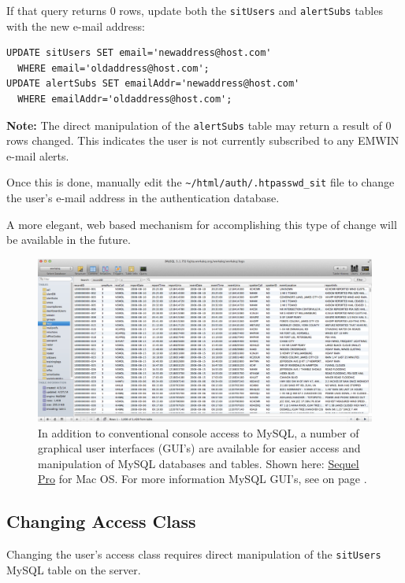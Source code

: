 \documentclass[pdflatex,letterpaper,twoside,12pt]{book}
\begin{document}
If that query returns 0 rows, update both the \verb|sitUsers| and \verb|alertSubs| tables with the new e-mail address:

\begin{verbatim}
UPDATE sitUsers SET email='newaddress@host.com'
  WHERE email='oldaddress@host.com';
UPDATE alertSubs SET emailAddr='newaddress@host.com'
  WHERE emailAddr='oldaddress@host.com';
\end{verbatim}   

{\bf Note:}  The direct manipulation of the \verb|alertSubs| table may return a result of 0 rows changed.  This indicates the user is not currently subscribed to any EMWIN e-mail alerts.

Once this is done, manually edit the \verb|~/html/auth/.htpasswd_sit| file to change the user's e-mail address in the authentication database.

A more elegant, web based mechanism for accomplishing this type of change will be available in the future.

\begin{figure}[t]
  \centering
  \includegraphics[width=\textwidth,keepaspectratio=true]{img/sequel-pro}
  \caption{In addition to conventional console access to MySQL, a number of graphical user interfaces (GUI's) are available for easier access and manipulation of MySQL databases and tables.  Shown here: \href{http://www.sequelpro.com/}{Sequel Pro} for Mac OS.  For more information MySQL GUI's, see  on page \pageref{database-server}.\label{fig:sequel-pro}}
\end{figure}

\subsection{Changing Access Class}

Changing the user's access class requires direct manipulation of the \verb|sitUsers| MySQL table on the server.
\end{document}
